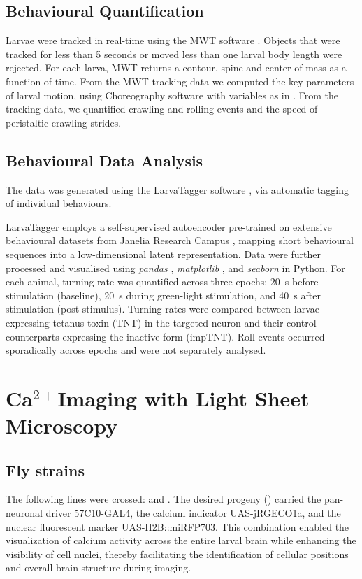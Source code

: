     \subsection{Behavioural Quantification}
    Larvae were tracked in real-time using the MWT software \citep{Swierczek2011MWT}.  Objects that were tracked for less than 5 seconds or moved less than one larval body length were rejected. For each larva, MWT returns a contour, spine and center of mass as a function of time. From the MWT tracking data we computed the key parameters of larval motion, using Choreography software \citep{Swierczek2011MWT} with variables as in \citep{Ohyama2013PlosONE}. From the tracking data, we quantified crawling and rolling events and the speed of peristaltic crawling strides. %

    \subsection{Behavioural Data Analysis}
    The data was generated using the LarvaTagger software \citep{laurent2024larvatagger}, via automatic tagging of individual behaviours. 

    LarvaTagger employs a self-supervised autoencoder pre-trained on extensive behavioural datasets from Janelia Research Campus \citep{jovanic2016competitive, masson2020identifying, vogelstein2014discovery}, mapping short behavioural sequences into a low-dimensional latent representation.
    Data were further processed and visualised using \textit{pandas} \citep{mckinney2011pandas}, \textit{matplotlib} \citep{hunter2007matplotlib}, and \textit{seaborn} \citep{waskom2021seaborn} in Python.
    For each animal, turning rate was quantified across three epochs: 20~s before stimulation (baseline), 20~s during green-light stimulation, and 40~s after stimulation (post-stimulus). Turning rates were compared between larvae expressing tetanus toxin (TNT) in the targeted neuron and their control counterparts expressing the inactive form (impTNT). Roll events occurred sporadically across epochs and were not separately analysed.

\section{Ca\texorpdfstring{$^{2+}$}{2+}Imaging with Light Sheet Microscopy}
    \subsection{Fly strains} %
    The following lines were crossed:
     and . The desired progeny () carried the pan-neuronal driver 57C10-GAL4, the calcium indicator UAS-jRGECO1a, and the nuclear fluorescent marker UAS-H2B::miRFP703. This combination enabled the visualization of calcium activity across the entire larval brain while enhancing the visibility of cell nuclei, thereby facilitating the identification of cellular positions and overall brain structure during imaging.

